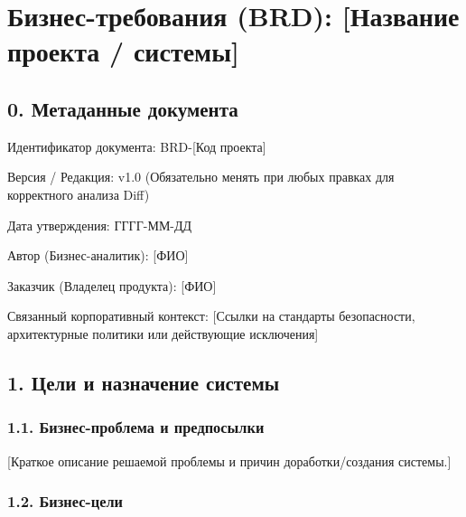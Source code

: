 \documentclass[10pt,a4paper]{article}
\begin{document}
\section{Бизнес-требования (BRD): {[}Название проекта / системы{]}}\label{ux431ux438ux437ux43dux435ux441-ux442ux440ux435ux431ux43eux432ux430ux43dux438ux44f-brd-ux43dux430ux437ux432ux430ux43dux438ux435-ux43fux440ux43eux435ux43aux442ux430--ux441ux438ux441ux442ux435ux43cux44b}

\subsection{0. Метаданные документа}\label{0-ux43cux435ux442ux430ux434ux430ux43dux43dux44bux435-ux434ux43eux43aux443ux43cux435ux43dux442ux430}

Идентификатор документа: BRD-{[}Код проекта{]}

Версия / Редакция: v1.0 (Обязательно менять при любых правках для корректного анализа Diff)

Дата утверждения: ГГГГ-ММ-ДД

Автор (Бизнес-аналитик): {[}ФИО{]}

Заказчик (Владелец продукта): {[}ФИО{]}

Связанный корпоративный контекст: {[}Ссылки на стандарты безопасности, архитектурные политики или действующие исключения{]}

\subsection{1. Цели и назначение системы}\label{1-ux446ux435ux43bux438-ux438-ux43dux430ux437ux43dux430ux447ux435ux43dux438ux435-ux441ux438ux441ux442ux435ux43cux44b}

\subsubsection{1.1. Бизнес-проблема и предпосылки}\label{11-ux431ux438ux437ux43dux435ux441-ux43fux440ux43eux431ux43bux435ux43cux430-ux438-ux43fux440ux435ux434ux43fux43eux441ux44bux43bux43aux438}

{[}Краткое описание решаемой проблемы и причин доработки/создания системы.{]}

\subsubsection{1.2. Бизнес-цели}\label{12-ux431ux438ux437ux43dux435ux441-ux446ux435ux43bux438}
\end{document}
